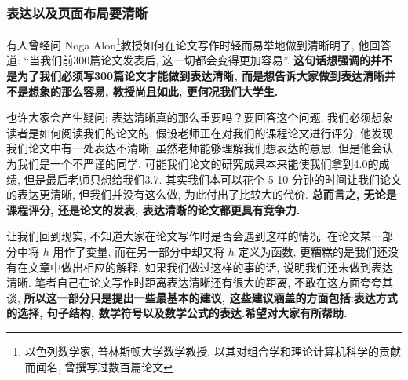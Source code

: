 \documentclass{booki}
\begin{document}
\subsubsection{表达以及页面布局要清晰}
有人曾经问 Noga Alon\footnote{以色列数学家, 普林斯顿大学数学教授, 以其对组合学和理论计算机科学的贡献而闻名, 曾撰写过数百篇论文}教授如何在论文写作时轻而易举地做到清晰明了, 他回答道: {``}当我们前300篇论文发表后, 这一切都会变得更加容易''\cite{pakhow}. \textbf{这句话想强调的并不是为了我们必须写300篇论文才能做到表达清晰, 而是想告诉大家做到表达清晰并不是想象的那么容易, 教授尚且如此, 更何况我们大学生.} \par
也许大家会产生疑问: 表达清晰真的那么重要吗？要回答这个问题, 我们必须想象读者是如何阅读我们的论文的. 假设老师正在对我们的课程论文进行评分, 他发现我们论文中有一处表达不清晰, 虽然老师能够理解我们想表达的意思, 但是他会认为我们是一个不严谨的同学, 可能我们论文的研究成果本来能使我们拿到4.0的成绩, 但是最后老师只想给我们3.7. 其实我们本可以花个 5-10 分钟的时间让我们论文的表达更清晰, 但我们并没有这么做, 为此付出了比较大的代价. \textbf{总而言之, 无论是课程评分, 还是论文的发表, 表达清晰的论文都更具有竞争力.} \par
让我们回到现实, 不知道大家在论文写作时是否会遇到这样的情况: 在论文某一部分中将 $h$ 用作了变量, 而在另一部分中却又将 $h$ 定义为函数, 更糟糕的是我们还没有在文章中做出相应的解释. 如果我们做过这样的事的话, 说明我们还未做到表达清晰. 笔者自己在论文写作时距离表达清晰还有很大的距离, 不敢在这方面夸夸其谈, \textbf{所以这一部分只是提出一些最基本的建议, {这些建议涵盖的方面包括:表达方式的选择, 句子结构, 数学符号以及数学公式的表达}.希望对大家有所帮助. }
\end{document}
